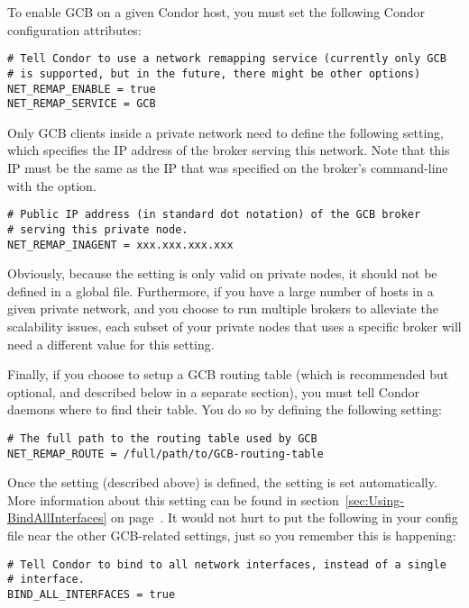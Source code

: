 To enable GCB on a given Condor host, you must set the following
Condor configuration attributes:

\footnotesize
\begin{verbatim}
# Tell Condor to use a network remapping service (currently only GCB
# is supported, but in the future, there might be other options)
NET_REMAP_ENABLE = true
NET_REMAP_SERVICE = GCB
\end{verbatim}
\normalsize

Only GCB clients inside a private network need to define the following
setting, which specifies the IP address of the broker serving this
network.
Note that this IP must be the same as the IP that was specified on the
broker's command-line with the  option.

\footnotesize
\begin{verbatim}
# Public IP address (in standard dot notation) of the GCB broker
# serving this private node.
NET_REMAP_INAGENT = xxx.xxx.xxx.xxx
\end{verbatim}
\normalsize

Obviously, because the  setting is only
valid on private nodes, it should not be defined in a global
 file.
Furthermore, if you have a large number of hosts in a given private
network, and you choose to run multiple brokers to alleviate the
scalability issues, each subset of your private nodes that uses a
specific broker will need a different value for this setting.

Finally, if you choose to setup a GCB routing table (which is
recommended but optional, and described below in a separate section),
you must tell Condor daemons where to find their table.
You do so by defining the following setting:

\footnotesize
\begin{verbatim}
# The full path to the routing table used by GCB
NET_REMAP_ROUTE = /full/path/to/GCB-routing-table
\end{verbatim}
\normalsize

Once the  setting (described above) is
defined, the  setting is set
automatically.
More information about this setting can be found in
section~\ref{sec:Using-BindAllInterfaces} on
page~\pageref{sec:Using-BindAllInterfaces}.
It would not hurt to put the following in your config file near the
other GCB-related settings, just so you remember this is happening:

\footnotesize
\begin{verbatim}
# Tell Condor to bind to all network interfaces, instead of a single
# interface.
BIND_ALL_INTERFACES = true
\end{verbatim}
\normalsize

